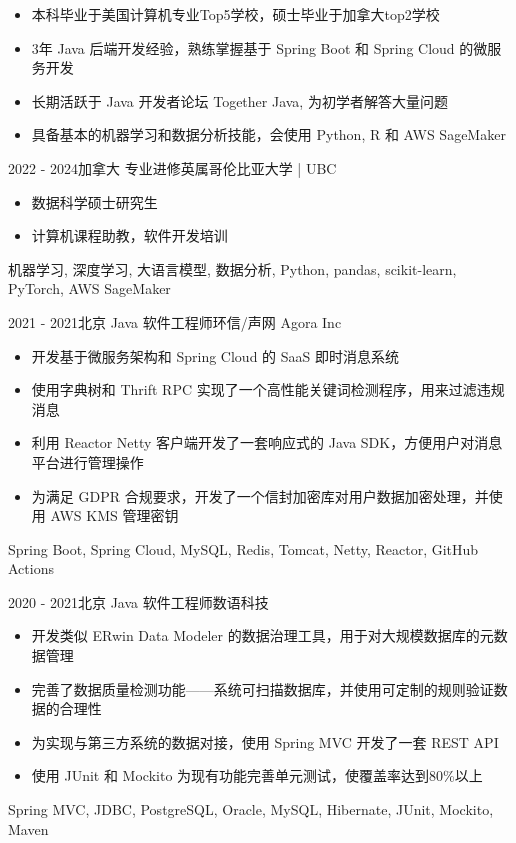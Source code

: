 \documentclass[alternative]{resume_template}
\begin{document}
\makecvheader

\begin{itemize}
    \item 本科毕业于美国计算机专业Top5学校，硕士毕业于加拿大top2学校
    \item 3年 Java 后端开发经验，熟练掌握基于 Spring Boot 和 Spring Cloud 的微服务开发
    \item 长期活跃于 Java 开发者论坛 Together Java, 为初学者解答大量问题
    \item 具备基本的机器学习和数据分析技能，会使用 Python, R 和 AWS SageMaker
\end{itemize}

\begin{experiences}

    \experience
    {2022 - 2024}{加拿大}
    {专业进修}{英属哥伦比亚大学 | UBC}
    {
        \begin{itemize}
            \item 数据科学硕士研究生
            \item 计算机课程助教，软件开发培训
        \end{itemize}
    }
    {机器学习, 深度学习, 大语言模型, 数据分析, Python, pandas, scikit-learn, PyTorch, AWS SageMaker}

    \experience
    {2021 - 2021}{北京}
    {Java 软件工程师}{环信/声网 Agora Inc}
    {
        \begin{itemize}
            \item 开发基于微服务架构和 Spring Cloud 的 SaaS 即时消息系统
            \item 使用字典树和 Thrift RPC 实现了一个高性能关键词检测程序，用来过滤违规消息
            \item 利用 Reactor Netty 客户端开发了一套响应式的 Java SDK，方便用户对消息平台进行管理操作
            \item 为满足 GDPR 合规要求，开发了一个信封加密库对用户数据加密处理，并使用 AWS KMS 管理密钥
        \end{itemize}
    }
    {Spring Boot, Spring Cloud, MySQL, Redis, Tomcat, Netty, Reactor, GitHub Actions}

    \experience
    {2020 - 2021}{北京}
    {Java 软件工程师}{数语科技}
    {
        \begin{itemize}
            \item 开发类似 ERwin Data Modeler 的数据治理工具，用于对大规模数据库的元数据管理
            \item 完善了数据质量检测功能——系统可扫描数据库，并使用可定制的规则验证数据的合理性
            \item 为实现与第三方系统的数据对接，使用 Spring MVC 开发了一套 REST API
            \item 使用 JUnit 和 Mockito 为现有功能完善单元测试，使覆盖率达到80\%以上
        \end{itemize}
    }
    {Spring MVC, JDBC, PostgreSQL, Oracle, MySQL, Hibernate, JUnit, Mockito, Maven}


\end{experiences}
\end{document}
